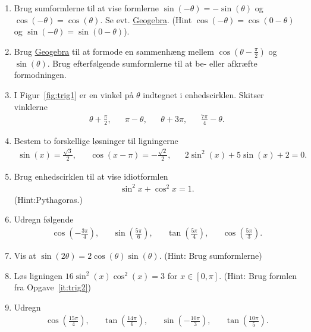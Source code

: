 \begin{enumerate}
	\item Brug sumformlerne til at vise formlerne $\sin(-\theta)=-\sin(\theta) $ og $\cos(-\theta)=\cos(\theta) $. Se evt. \href{https://www.geogebra.org/m/e2vTM4Ut}{Geogebra}. (Hint $\cos(-\theta)=\cos(0-\theta)$ og $\sin(-\theta)=\sin(0-\theta)$).
	
	\item Brug \href{https://www.geogebra.org/m/e2vTM4Ut}{Geogebra} til at formode en sammenhæng mellem $\cos(\theta-\frac{\pi}{2})$ og $\sin(\theta)$. Brug efterfølgende sumformlerne til at be- eller afkræfte formodningen.
	  
	  	\item \label{it:trig1} I Figur~\ref{fig:trig1} er en vinkel på $\theta$ indtegnet i enhedscirklen. Skitser vinklerne
	  \begin{align*}
	  \theta+ \frac{\pi}{2},&& \pi-\theta,&& \theta +3\pi,&& \frac{7\pi}{4}-\theta.
	  \end{align*}
	  
	
	 
	 \item Bestem to forskellige løsninger til ligningerne 
	 \begin{align*}
	 \sin(x)=\frac{\sqrt{3}}{2},&& \cos(x-\pi)=-\frac{\sqrt{2}}{2},&& 2\sin^2(x)+5\sin(x)+2=0.
	 \end{align*}

	\item Brug enhedscirklen til at vise idiotformlen
	\begin{align*}
	\sin^2x+\cos^2x=1.
	\end{align*}
	(Hint:Pythagoras.)

	\item Udregn følgende
	\begin{align*}
	\cos(-\frac{3\pi}{4}),&& \sin(\frac{5\pi}{6}),&&\tan(\frac{5\pi}{4}),&& \cos(\frac{5\pi}{3}).
	\end{align*}
	
	\item\label{it:trig2} Vis at $\sin(2\theta)=2\cos(\theta)\sin(\theta)$. (Hint: Brug sumformlerne)

	\item Løs ligningen $16\sin^2(x)\cos^2(x)=3$ for $x\in [0,\pi]$. (Hint: Brug formlen fra Opgave~\ref{it:trig2})
	
	\item Udregn
	\begin{align*}
	\cos(\frac{15\pi}{4}),&& \tan(\frac{14\pi}{6}),&& \sin(-\frac{10\pi}{3}),&& \tan(\frac{10 \pi}{5}).
	\end{align*}
	

\end{enumerate}
